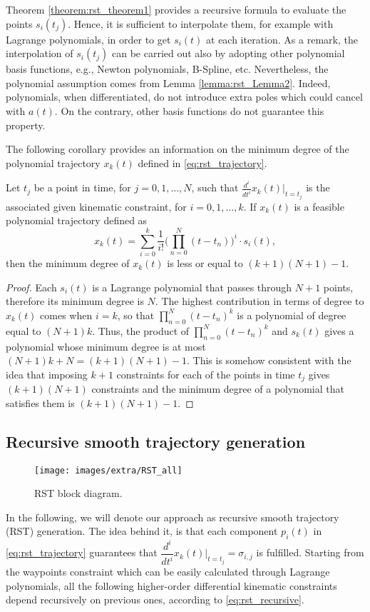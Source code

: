Theorem \ref{theorem:rst_theorem1} provides a recursive formula to evaluate the points $s_i(t_j)$. Hence, it is sufficient to interpolate them, for example with Lagrange polynomials, in order to get $s_i(t)$ at each iteration. As a remark, the interpolation of $s_i(t_j)$ can be carried out also by adopting other polynomial basis functions, e.g., Newton polynomials, B-Spline, etc. Nevertheless, the polynomial assumption comes from Lemma \ref{lemma:rst_Lemma2}. Indeed, polynomials, when differentiated, do not introduce extra poles which could cancel with $a(t)$. On the contrary, other basis functions do not guarantee this property.

The following corollary provides an information on the minimum degree of the polynomial trajectory $x_k(t)$ defined in \eqref{eq:rst_trajectory}.

\begin{corollary}
\label{corollary:rst_corollary1}
Let $t_j$ be a point in time, for $j=0,1,\dots, N$, such that $\frac{d^i}{dt^i}x_k(t)\bigr|_{t=t_j}$ is the associated given kinematic constraint, for $i=0,1,\dots, k$. If $x_k(t)$ is a feasible polynomial trajectory defined as
\begin{equation}
x_k(t) = \sum_{i=0}^{k}{\dfrac{1}{i!}\biggl(\prod_{n=0}^{N}{(t-t_n)}\biggr)^i\cdot s_i(t)},
\end{equation}
then the minimum degree of $x_k(t)$ is less or equal to $(k+1)(N+1)-1$.
\end{corollary}
\begin{proof}
Each $s_i(t)$ is a Lagrange polynomial that passes through $N+1$ points, therefore its minimum degree is $N$. The highest contribution in terms of degree to $x_k(t)$ comes when $i=k$, so that $\prod_{n=0}^{N}{(t-t_n)^k}$ is a polynomial of degree equal to $(N+1)k$. Thus, the product of $\prod_{n=0}^{N}{(t-t_n)^k}$ and $s_k(t)$ gives a polynomial whose minimum degree is at most $(N+1)k+N = (k+1)(N+1)-1$.
This is somehow consistent with the idea that imposing $k+1$ constraints for each of the points in time $t_j$ gives $(k+1)(N+1)$ constraints and the minimum degree of a polynomial that satisfies them is $(k+1)(N+1)-1$. \qedhere
\end{proof}

\subsection{Recursive smooth trajectory generation}
\label{subsec:rst_code}

\begin{figure}[t]
\texttt{[image: images/extra/RST\_all]}
\centering
\caption{RST block diagram.}
\label{fig:rst_RST}
\end{figure}
In the following, we will denote our approach as recursive smooth trajectory (RST) generation. The idea behind it, is that each component $p_i(t)$ in \eqref{eq:rst_trajectory} guarantees that $\dfrac{d^i}{dt^i}x_k(t)\bigr|_{t=t_j}=\sigma_{i,j}$ is fulfilled. Starting from the waypoints constraint which can be easily calculated through Lagrange polynomials, all the following higher-order differential kinematic constraints depend recursively on previous ones, according to \eqref{eq:rst_recursive}. 

